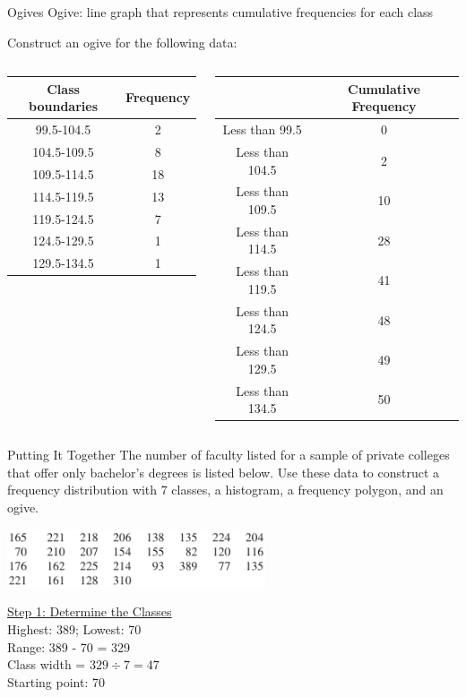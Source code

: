 \documentclass[t, aspectratio=169]{beamer}
\newcommand{\?}{\stackrel{?}{=}}
\begin{document}
	\begin{frame}{Ogives}
		Ogive: line graph that represents cumulative frequencies for each class \pause
		
		Construct an ogive for the following data:
		
		\begin{columns}
			\begin{column}{0.5\textwidth}
				\begin{tabular}{|c|c|} \hline
					Class boundaries & Frequency \\ \hline
					99.5-104.5 & 2 \\
					104.5-109.5 & 8 \\
					109.5-114.5 & 18 \\
					114.5-119.5 & 13 \\
					119.5-124.5 & 7 \\
					124.5-129.5 & 1 \\
					129.5-134.5 & 1 \\ \hline
				\end{tabular}
			\end{column}
			\begin{column}{0.5\textwidth}
				\begin{tabular}{|c|c|} \hline
					 & Cumulative Frequency \\ \hline
					Less than 99.5 & 0 \\
					Less than 104.5 & 2 \\
					Less than 109.5 & 10 \\
					Less than 114.5 & 28 \\
					Less than 119.5 & 41 \\
					Less than 124.5 & 48 \\
					Less than 129.5 & 49 \\
					Less than 134.5 & 50 \\ \hline
				\end{tabular}
			\end{column}
		\end{columns}
	\end{frame}

	\begin{frame}{Putting It Together}
		The number of faculty listed
		for a sample of private colleges that offer only bachelor’s
		degrees is listed below. Use these data to construct a fre­quency distribution with 7 classes, a histogram, a frequency
		polygon, and an ogive. \pause
		
		\includegraphics[width=3in]{faculty-data.png}
		
		\underline{Step 1: Determine the Classes} \\
		Highest: 389; Lowest: 70 \pause \\
		Range: 389 - 70 = 329 \pause \\
		Class width = $329 \div 7 = 47$ \pause \\
		Starting point: 70
	\end{frame}
\end{document}
